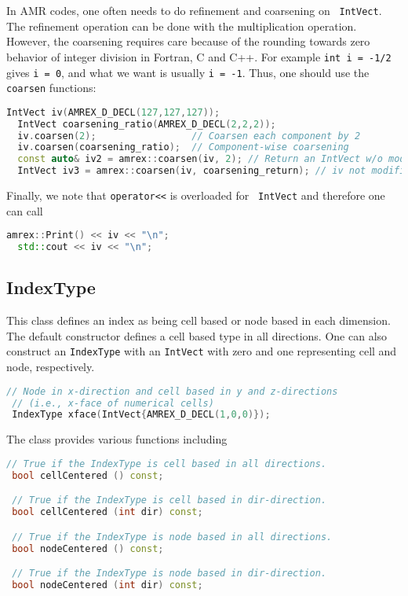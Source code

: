 In AMR codes, one often needs to do refinement and coarsening on {\tt
  IntVect}.  The refinement operation can be done with the
multiplication operation.  However, the coarsening requires care
because of the rounding towards zero behavior of integer division in
Fortran, C and C++.  For example {\tt int i = -1/2} gives {\tt i =
  0}, and what we want is usually {\tt i = -1}.  Thus, one should use
the {\tt coarsen} functions:
\begin{lstlisting}[language=cpp]
  IntVect iv(AMREX_D_DECL(127,127,127));
  IntVect coarsening_ratio(AMREX_D_DECL(2,2,2));
  iv.coarsen(2);                 // Coarsen each component by 2
  iv.coarsen(coarsening_ratio);  // Component-wise coarsening
  const auto& iv2 = amrex::coarsen(iv, 2); // Return an IntVect w/o modifying iv
  IntVect iv3 = amrex::coarsen(iv, coarsening_return); // iv not modified
\end{lstlisting}

Finally, we note that {\tt operator<<} is overloaded for {\tt
  IntVect} and therefore one can call
\begin{lstlisting}[language=cpp]
  amrex::Print() << iv << "\n";
  std::cout << iv << "\n";
\end{lstlisting}

\subsection{IndexType}

This class defines an index as being cell based or node based in
each dimension.  The default constructor defines a cell based type in
all directions.  One can also construct an {\tt IndexType} with an
{\tt IntVect} with zero and one representing cell and node,
respectively.
\begin{lstlisting}[language=cpp]
 // Node in x-direction and cell based in y and z-directions
 // (i.e., x-face of numerical cells)
 IndexType xface(IntVect{AMREX_D_DECL(1,0,0)});
\end{lstlisting}
The class provides various functions including
\begin{lstlisting}[language=cpp]
 // True if the IndexType is cell based in all directions.
 bool cellCentered () const;

 // True if the IndexType is cell based in dir-direction.
 bool cellCentered (int dir) const;

 // True if the IndexType is node based in all directions.
 bool nodeCentered () const;

 // True if the IndexType is node based in dir-direction.
 bool nodeCentered (int dir) const;
\end{lstlisting}

